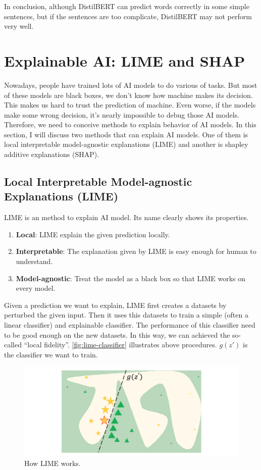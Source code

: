 \documentclass{article}[12pt]
\begin{document}
In conclusion, although DistilBERT can predict words correctly in some simple sentences, but if the sentences are too complicate, DistilBERT may not perform very well.

\section{Explainable AI: LIME and SHAP}

Nowadays, people have trained lots of AI models to do various of tasks. But most of these models are black boxes, we don't know how machine makes its decision. This makes us hard to trust the prediction of machine. Even worse, if the models make some wrong decision, it's nearly impossible to debug those AI models. Therefore, we need to conceive methods to explain behavior of AI models. In this section, I will discuss two methods that can explain AI models. One of them is local interpretable model-agnostic explanations (LIME) and another is shapley additive explanations (SHAP).

\subsection{Local Interpretable Model-agnostic Explanations (LIME)}

LIME is an method to explain AI model. Its name clearly shows its properties.

\begin{enumerate}
	\item \textbf{Local}: LIME explain the given prediction locally.
	\item \textbf{Interpretable}: The explanation given by LIME is easy enough for human to understand.
	\item \textbf{Model-agnostic}: Treat the model as a black box so that LIME works on every model.
\end{enumerate}

Given a prediction we want to explain, LIME first creates a datasets by perturbed the given input. Then it uses this datasets to train a simple (often a linear classifier) and explainable classifier. The performance of this classifier need to be good enough on the new datasets. In this way, we can achieved the so-called ``local fidelity''. \autoref{fig:lime-classifier} illustrates above procedures. $g(z')$ is the classifier we want to train.

\begin{figure}[htbp]
	\centering
	\includegraphics[width=0.7\linewidth]{figure/lime-classifier}
	\caption[]{How LIME works.\footnotemark}
	\label{fig:lime-classifier}
\end{figure}
\end{document}

